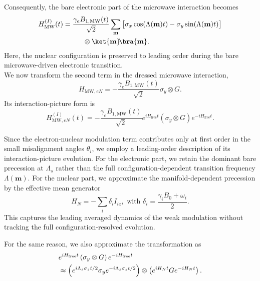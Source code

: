 Consequently, the bare electronic part of the microwave interaction becomes
\begin{equation}
\begin{aligned}
H_{\mathrm{MW}}^{(I)}(t)
&=
\frac{\gamma_e B_{1,\mathrm{MW}}(t)}{\sqrt2}
\sum_{\mathbf m}
\big[
\sigma_x\cos(\Lambda(\mathbf m)t)
-
\sigma_y\sin(\Lambda(\mathbf m)t)
\big]
\\
&\hspace{1cm}\otimes
\ket{\mathbf m}\!\bra{\mathbf m}.
\end{aligned}
\label{eq:HMW_I}
\end{equation}
Here, the nuclear configuration is preserved to leading order during the bare
microwave-driven electronic transition.\\

%



We now transform the second term in the dressed microwave interaction,
\[
H_{\mathrm{MW},eN}
=
-\frac{\gamma_e B_{1,\mathrm{MW}}(t)}{\sqrt2}
\sigma_y\otimes G .
\]
Its interaction-picture form is
\begin{equation}
H_{\mathrm{MW},eN}^{(I)}(t)
=
-\frac{\gamma_e B_{1,\mathrm{MW}}(t)}{\sqrt2}
e^{iH_{\mathrm{free}}t}
\left(
\sigma_y\otimes G
\right)
e^{-iH_{\mathrm{free}}t}.
\label{eq:HeN_IP_start}
\end{equation}

Since the electron-nuclear modulation term contributes only at first order in the small misalignment angles $\theta_i$, we employ a leading-order description of its interaction-picture evolution. For the electronic part, we retain the dominant bare precession at $\Lambda_s$ rather than the full configuration-dependent transition frequency $\Lambda(\mathbf m)$. For the nuclear part, we approximate the manifold-dependent precession by the effective mean generator
\[
H_N
=
-\sum_i \delta_i I_{iz},
\,\, \text{with}\,\,
\delta_i
=
\frac{\gamma_iB_0+\omega_i}{2}.
\]
This captures the leading averaged dynamics of the weak modulation without
tracking the full configuration-resolved evolution.

For the same reason, we also approximate the transformation as
\begin{equation}
\begin{aligned}
&e^{iH_{\mathrm{free}}t}
\left(
\sigma_y\otimes G
\right)
e^{-iH_{\mathrm{free}}t}
\notag\\
&\approx
\left(
e^{i\Lambda_s\sigma_z t/2}
\sigma_y
e^{-i\Lambda_s\sigma_z t/2}
\right)
\otimes
\left(
e^{iH_N t}
G
e^{-iH_N t}
\right).
\end{aligned}
\label{eq:sigmayG_factorized}
\end{equation}

